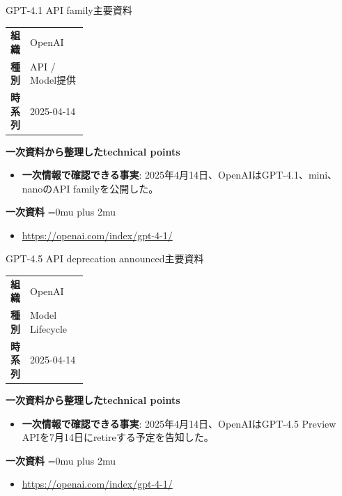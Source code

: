 \begin{technicalnote}{GPT-4.1 API family}{主要資料}
\begingroup
\begin{tabularx}{\linewidth}{@{}>{\bfseries}p{0.22\linewidth}X@{}}
組織 & OpenAI \\
種別 & API / Model提供 \\
時系列 & 2025-04-14 \\
\end{tabularx}
\smallskip
\begin{minipage}{\linewidth}
{\bfseries 一次資料から整理したtechnical points}
\begin{itemize}[leftmargin=1.5em,itemsep=0.35em]
\item \textbf{一次情報で確認できる事実}: 2025年4月14日、OpenAIはGPT-4.1、mini、nanoのAPI familyを公開した。
\end{itemize}
\begin{samepage}
{\bfseries 一次資料}
\begingroup\sloppy
\Urlmuskip=0mu plus 2mu\relax
\begin{itemize}[leftmargin=1.5em,itemsep=0.25em]
\item {\scriptsize\url{https://openai.com/index/gpt-4-1/}}
\end{itemize}
\endgroup
\end{samepage}
\end{minipage}
\endgroup
\end{technicalnote}
\medskip

\begin{technicalnote}{GPT-4.5 API deprecation announced}{主要資料}
\begingroup
\begin{tabularx}{\linewidth}{@{}>{\bfseries}p{0.22\linewidth}X@{}}
組織 & OpenAI \\
種別 & Model Lifecycle \\
時系列 & 2025-04-14 \\
\end{tabularx}
\smallskip
\begin{minipage}{\linewidth}
{\bfseries 一次資料から整理したtechnical points}
\begin{itemize}[leftmargin=1.5em,itemsep=0.35em]
\item \textbf{一次情報で確認できる事実}: 2025年4月14日、OpenAIはGPT-4.5 Preview APIを7月14日にretireする予定を告知した。
\end{itemize}
\begin{samepage}
{\bfseries 一次資料}
\begingroup\sloppy
\Urlmuskip=0mu plus 2mu\relax
\begin{itemize}[leftmargin=1.5em,itemsep=0.25em]
\item {\scriptsize\url{https://openai.com/index/gpt-4-1/}}
\end{itemize}
\endgroup
\end{samepage}
\end{minipage}
\endgroup
\end{technicalnote}
\medskip

